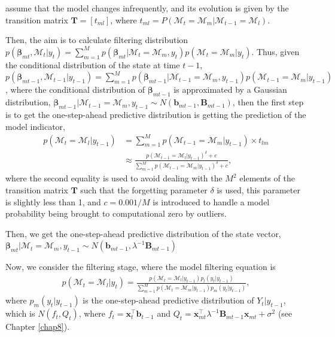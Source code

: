 \cite{raftery2010online} assume that the model changes infrequently, and its evolution is given by the transition matrix $\bm{T}=[t_{ml}]$, where $t_{ml}=P(\mathcal{M}_t=\mathcal{M}_m|\mathcal{M}_{t-1}=\mathcal{M}_l)$.

Then, the aim is to calculate filtering distribution $p(\bm{\beta}_{mt},\mathcal{M}_t|y_t)=\sum_{m=1}^Mp(\bm{\beta}_{mt}|\mathcal{M}_t=\mathcal{M}_m,y_t)p(\mathcal{M}_t=\mathcal{M}_m|y_t)$. Thus, given the conditional distribution of the state at time $t-1$, $p(\bm{\beta}_{mt-1},\mathcal{M}_{t-1}|{y}_{t-1})=\sum_{m=1}^Mp(\bm{\beta}_{mt-1}|\mathcal{M}_{t-1}=\mathcal{M}_m,{y}_{t-1})p(\mathcal{M}_{t-1}=\mathcal{M}_m|{y}_{t-1})$, where the conditional distribution of $\bm{\beta}_{mt-1}$ is approximated by a Gaussian distribution, $\bm{\beta}_{mt-1}|\mathcal{M}_{t-1}=\mathcal{M}_{m},y_{t-1}\sim N(\bm{b}_{mt-1},\bm{B}_{mt-1})$, then the first step is to get the one-step-ahead predictive distribution is getting the prediction of the model indicator, 
\begin{align*}
	p(\mathcal{M}_t=\mathcal{M}_l|y_{t-1})&=\sum_{m=1}^M p(\mathcal{M}_{t-1}=\mathcal{M}_m|y_{t-1})\times t_{lm}\\
	&\approx \frac{p(\mathcal{M}_{t-1}=\mathcal{M}_l|y_{t-1})^{\delta}+c}{\sum_{m=1}^M p(\mathcal{M}_{t-1}=\mathcal{M}_m|y_{t-1})^{\delta}+c},  
\end{align*}
where the second equality is used to avoid dealing with the $M^2$ elements of the transition matrix $\bm{T}$ such that the forgetting parameter $\delta$ is used, this parameter is slightly less than 1, and $c=0.001/M$ is introduced to handle a model probability being brought to computational zero by outliers.

Then, we get the one-step-ahead predictive distribution of the state vector, $\bm{\beta}_{mt}|\mathcal{M}_{t}=\mathcal{M}_{m},y_{t-1}\sim N(\bm{b}_{mt-1},\lambda^{-1}\bm{B}_{mt-1})$ 

Now, we consider the filtering stage, where the model filtering equation is 
\begin{align*}
	p(\mathcal{M}_t=\mathcal{M}_l|y_{t})=\frac{p(\mathcal{M}_t=\mathcal{M}_l|y_{t-1})p_l(y_t|y_{t-1})}{\sum_{m=1}^M p(\mathcal{M}_t=\mathcal{M}_m|y_{t-1})p_m(y_t|y_{t-1})},
\end{align*}
where $p_m(y_t|y_{t-1})$ is the one-step-ahead predictive distribution of $Y_t|{y}_{t-1}$, which is $N(f_t,Q_t)$, where $f_t=\bm{x}_t^{\top}\bm{b}_{t-1}$ and $Q_t=\bm{x}_{mt}^{\top}\lambda^{-1}\bm{B}_{mt-1}\bm{x}_{mt}+\sigma^2$ (see Chapter \ref{chap8}).

